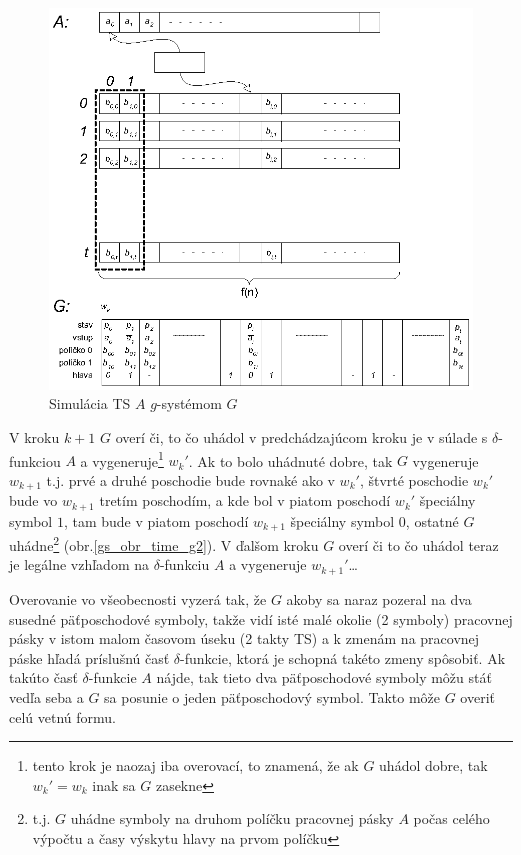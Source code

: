 \begin{dokaz}
\begin{figure}[!ht]
  \centering
  \includegraphics{./OBRAZKY/GSYSTEMS/TIME_G}
  \caption{Simulácia TS $A$ $g$-systémom $G$} \label{gs_obr_time_g}
\end{figure}

V kroku $k+1$ $G$ overí či, to čo uhádol v predchádzajúcom kroku
je v súlade s $\delta$-funkciou $A$ a vygeneruje\footnote{tento
krok je naozaj iba overovací, to znamená, že ak $G$ uhádol dobre,
tak $w_k'=w_k$ inak sa $G$ zasekne} $w_k'$. Ak to bolo uhádnuté
dobre, tak $G$ vygeneruje $w_{k+1}$ t.j. prvé a druhé poschodie
bude rovnaké ako v $w_k'$, štvrté poschodie $w_k'$ bude vo
$w_{k+1}$ tretím poschodím, a kde bol v piatom poschodí $w_k'$
špeciálny symbol $1$, tam bude v piatom poschodí $w_{k+1}$
špeciálny symbol $0$, ostatné $G$ uhádne\footnote{t.j. $G$ uhádne
symboly na druhom políčku pracovnej pásky $A$ počas celého výpočtu
a časy výskytu hlavy na prvom políčku} (obr.\ref{gs_obr_time_g2}). V
ďalšom kroku $G$ overí či to čo uhádol teraz je legálne vzhľadom
na $\delta$-funkciu $A$ a vygeneruje $w_{k+1}'$\dots

Overovanie vo všeobecnosti vyzerá tak, že $G$ akoby sa naraz
pozeral na dva susedné päťposchodové symboly, takže vidí isté malé
okolie (2 symboly) pracovnej pásky v istom malom časovom úseku (2
takty TS) a k zmenám na pracovnej páske hľadá príslušnú časť
$\delta$-funkcie, ktorá je schopná takéto zmeny spôsobiť. Ak
takúto časť $\delta$-funkcie $A$ nájde, tak tieto dva
päťposchodové symboly môžu stáť vedľa seba a $G$ sa posunie o
jeden päťposchodový symbol. Takto môže $G$ overiť celú vetnú
formu.


\end{dokaz}
